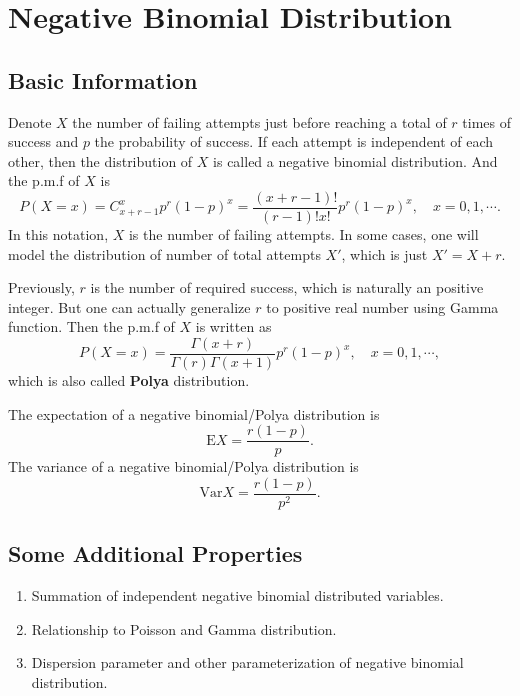 \documentclass[a4paper,12pt]{article}
\begin{document}
\section{Negative Binomial Distribution}
\label{sec:negat-binom-distr}

\subsection{Basic Information}
\label{sec:basic-information-1}

Denote $X$ the number of failing attempts just before reaching a total of $r$ times of success and $p$ the probability of success. If each attempt is independent of each other, then the distribution of $X$ is called a negative binomial distribution. And the p.m.f of $X$ is
\[
  P\left(X = x\right)
  = C_{x + r - 1}^xp^r\left(1 - p\right)^x
  = \frac{\left(x + r - 1\right)!}{\left(r - 1\right)!x!}p^r\left(1 - p\right)^x
  ,\quad
  x = 0, 1, \cdots .
\]
In this notation, $X$ is the number of failing attempts. In some cases, one will model the distribution of number of total attempts $X'$, which is just $X' = X + r$. 

\par

Previously, $r$ is the number of required success, which is naturally an positive integer. But one can actually generalize $r$ to positive real number using Gamma function. Then the p.m.f of $X$ is written as
\[
  P\left(X = x\right) = \frac{\Gamma(x + r)}{\Gamma(r)\Gamma(x + 1)}p^r\left(1 - p\right)^x
  ,\quad
  x = 0, 1, \cdots
  ,
\]
which is also called \textbf{Polya} distribution.

\par

The expectation of a negative binomial/Polya distribution is
\[
  \mathrm{E}X = \frac{r\left(1 - p\right)}{p}
  .
\]
The variance of a negative binomial/Polya distribution is
\[
  \mathrm{Var}X = \frac{r\left(1 - p\right)}{p ^ 2}
  .
\]

\subsection{Some Additional Properties}
\label{sec:some-addit-prop-1}

\begin{enumerate}
\item Summation of independent negative binomial distributed variables.
\item Relationship to Poisson and Gamma distribution.
\item Dispersion parameter and other parameterization of negative binomial distribution.
\end{enumerate}
\end{document}
